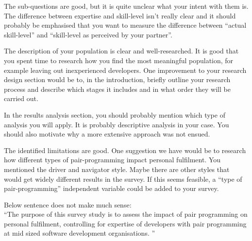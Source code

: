 \documentclass[times, 10pt,twocolumn]{IEEEtran}
\begin{document}
The sub-questions are good, but it is quite unclear what your intent with them is. The difference between expertise and skill-level isn't really clear and it should probably be emphasised that you want to measure the difference between ``actual skill-level'' and ``skill-level as perceived by your partner''. 


The description of your population is clear and well-researched. It is good that you spent time to research how you find the most meaningful population, for example leaving out inexperienced developers. One improvement to your research design section would be to, in the introduction, briefly outline your research process and describe which stages it includes and in what order they will be carried out. 

In the results analysis section, you should probably mention which type of analysis you will apply. It is probably descriptive analysis in your case. You should also motivate why a more extensive approach was not ensued. 

The identified limitations are good. One suggestion we have would be to research how different types of pair-programming impact personal fulfilment. You mentioned the driver and navigator style. Maybe there are other styles that would get widely different results in the survey. If this seems feasible, a ``type of pair-programming'' independent variable could be added to your survey. 


Below sentence does not make much sense: \\
``The purpose of this survey study is to assess the impact of pair programming on personal fulfilment, controlling for expertise of developers with pair programming at mid sized software development organisations. ''
\end{document}
